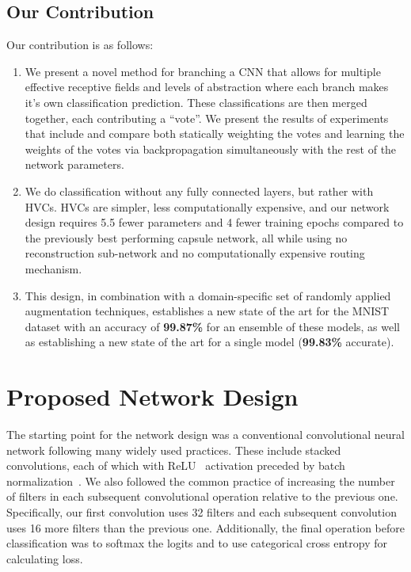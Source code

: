\documentclass{article}
\begin{document}
\subsection{Our Contribution}
Our contribution is as follows:
\begin{enumerate}
  \item We present a novel method for branching a CNN that allows for multiple effective receptive fields and levels of abstraction where each branch makes it's own classification prediction.  These classifications are then merged together, each contributing a ``vote''.  We present the results of experiments that include and compare both statically weighting the votes and learning the weights of the votes via backpropagation simultaneously with the rest of the network parameters.
  \item We do classification without any fully connected layers, but rather with HVCs.  HVCs are simpler, less computationally expensive, and our network design requires 5.5 fewer parameters and 4 fewer training epochs compared to the previously best performing capsule network, all while using no reconstruction sub-network and no computationally expensive routing mechanism.\@
  \item  This design, in combination with a domain-specific set of randomly applied augmentation techniques, establishes a new state of the art for the MNIST dataset with an accuracy of \textbf{99.87\%} for an ensemble of these models, as well as establishing a new state of the art for a single model (\textbf{99.83\%} accurate).
\end{enumerate}

\section{Proposed Network Design}\label{sec:proposed_network_design}

The starting point for the network design was a conventional convolutional neural network following many widely used practices.  These include stacked  convolutions, each of which with ReLU~\cite{Glorot2011} activation preceded by batch normalization~\cite{Ioffe2015}.  We also followed the common practice of increasing the number of filters in each subsequent convolutional operation relative to the previous one.  Specifically, our first convolution uses 32 filters and each subsequent convolution uses 16 more filters than the previous one.  Additionally, the final operation before classification was to softmax the logits and to use categorical cross entropy for calculating loss.
\end{document}
